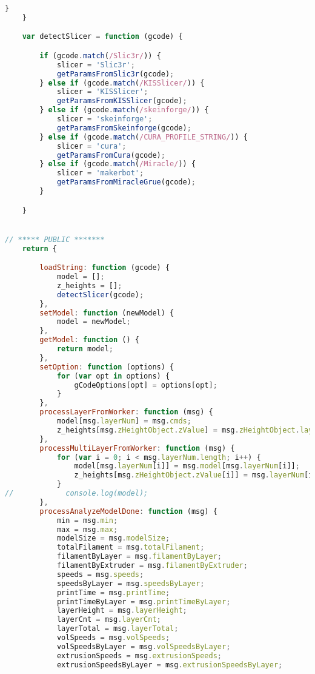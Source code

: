 \begin{lstlisting}[language=JavaScript, label={lst:gcodeFactory}, caption=gcodeFactory.js is the main gcode header parsing code.]
        }
    }

    var detectSlicer = function (gcode) {

        if (gcode.match(/Slic3r/)) {
            slicer = 'Slic3r';
            getParamsFromSlic3r(gcode);
        } else if (gcode.match(/KISSlicer/)) {
            slicer = 'KISSlicer';
            getParamsFromKISSlicer(gcode);
        } else if (gcode.match(/skeinforge/)) {
            slicer = 'skeinforge';
            getParamsFromSkeinforge(gcode);
        } else if (gcode.match(/CURA_PROFILE_STRING/)) {
            slicer = 'cura';
            getParamsFromCura(gcode);
        } else if (gcode.match(/Miracle/)) {
            slicer = 'makerbot';
            getParamsFromMiracleGrue(gcode);
        }

    }


// ***** PUBLIC *******
    return {

        loadString: function (gcode) {
            model = [];
            z_heights = [];
            detectSlicer(gcode);
        },
        setModel: function (newModel) {
            model = newModel;
        },
        getModel: function () {
            return model;
        },
        setOption: function (options) {
            for (var opt in options) {
                gCodeOptions[opt] = options[opt];
            }
        },
        processLayerFromWorker: function (msg) {
            model[msg.layerNum] = msg.cmds;
            z_heights[msg.zHeightObject.zValue] = msg.zHeightObject.layer;
        },
        processMultiLayerFromWorker: function (msg) {
            for (var i = 0; i < msg.layerNum.length; i++) {
                model[msg.layerNum[i]] = msg.model[msg.layerNum[i]];
                z_heights[msg.zHeightObject.zValue[i]] = msg.layerNum[i];
            }
//            console.log(model);
        },
        processAnalyzeModelDone: function (msg) {
            min = msg.min;
            max = msg.max;
            modelSize = msg.modelSize;
            totalFilament = msg.totalFilament;
            filamentByLayer = msg.filamentByLayer;
            filamentByExtruder = msg.filamentByExtruder;
            speeds = msg.speeds;
            speedsByLayer = msg.speedsByLayer;
            printTime = msg.printTime;
            printTimeByLayer = msg.printTimeByLayer;
            layerHeight = msg.layerHeight;
            layerCnt = msg.layerCnt;
            layerTotal = msg.layerTotal;
            volSpeeds = msg.volSpeeds;
            volSpeedsByLayer = msg.volSpeedsByLayer;
            extrusionSpeeds = msg.extrusionSpeeds;
            extrusionSpeedsByLayer = msg.extrusionSpeedsByLayer;


\end{lstlisting}
